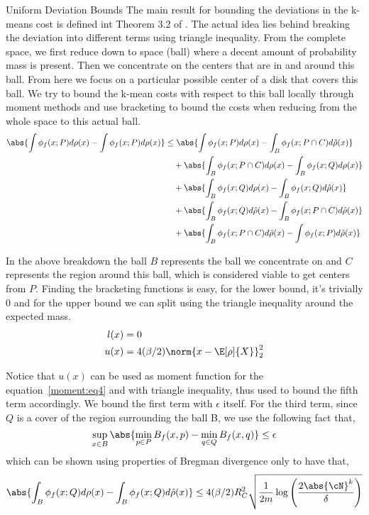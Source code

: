 \documentclass[10pt]{article}
\begin{document}
\begin{psection}{Uniform Deviation Bounds}
    The main result for bounding the deviations in the k-means cost is defined int
    Theorem 3.2 of \citep{telgarsky2013moment}. The actual idea lies behind breaking the
    deviation into different terms using triangle inequality. From the complete space,
    we first reduce down to space (ball) where a decent amount of probability mass is
    present. Then we concentrate on the centers that are in and around this ball. From
    here we focus on a particular possible center of a disk that covers this ball. We
    try to bound the k-mean costs with respect to this ball locally through moment
    methods and use bracketing to bound the costs when reducing from the whole space to
    this actual ball. 
    \begin{align*}
        \abs{\int \phi_f(x; P) d\rho(x) - \int \phi_f(x; P)d{\rho}(x)}
        &\leq  \abs{\int \phi_f(x; P) d\rho(x) - \int_B \phi_f(x; P \cap C)d\hat{\rho}(x)} \\
        &\quad+ \abs{\int_B \phi_f(x; P \cap C) d\rho(x) - \int_B \phi_f(x; Q)d{\rho}(x)} \\
        &\quad+ \abs{\int_B \phi_f(x; Q) d\rho(x) - \int_B \phi_f(x; Q)d\hat{\rho}(x)} \\
        &\quad+ \abs{\int_B \phi_f(x; Q) d\hat{\rho}(x) - \int_B \phi_f(x; P \cap C)d\hat{\rho}(x)} \\
        &\quad+ \abs{\int_B \phi_f(x; P \cap C) d\hat{\rho}(x) - \int \phi_f(x; P )d\hat{\rho}(x)}
    \end{align*}

    In the above breakdown the ball $B$ represents the ball we concentrate on and $C$
    represents the region around this ball, which is considered viable to get centers
    from $P$. Finding the bracketing functions is easy, for the lower bound, it's
    trivially $0$ and for the upper bound we can split using the triangle inequality
    around the expected mass. 
    \begin{align*}
        l(x) &= 0 \\
        u(x) &= 4(\beta/2)\norm{x - \E[\rho]{X}}^2_2
    \end{align*}

    Notice that $u(x)$ can be used as moment function for the equation~\ref{moment:eq4}
    and with triangle inequality, thus used to bound the fifth term accordingly. We
    bound the first term with $\epsilon$ itself. For the third term, since $Q$ is a
    cover of the region surrounding the ball B, we use the following fact that,
    \begin{equation}
        \label{moment:eq5}
        \sup_{x \in B} \abs{\min_{p \in P} B_f(x, p)  - \min_{q\in Q}B_f(x,q)} \leq \epsilon
    \end{equation}
    which can be shown using properties of Bregman divergence only to have that, 
    \begin{equation}
        \label{moment:eq6}
        \abs{\int_B \phi_f(x; Q) d\rho(x) - \int_B \phi_f(x; Q)d\hat{\rho}(x)} \leq 4(\beta/2)R_C^2 \sqrt{\frac{1}{2m}\log\left(\frac{2 \abs{\cN}^k}{\delta}\right)}
    \end{equation}


\end{psection}
\end{document}
